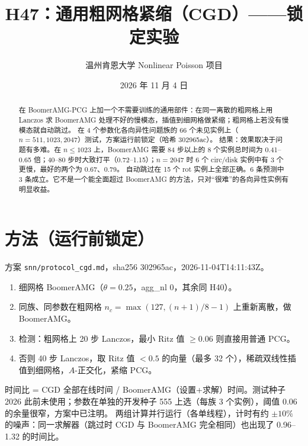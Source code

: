 \documentclass[11pt,a4paper]{ctexart}
\title{H47：通用粗网格紧缩（CGD）——锁定实验}
\author{温州肯恩大学 \quad Nonlinear Poisson 项目}
\date{2026 年 11 月 4 日}
\begin{document}
\sloppy
\maketitle
\begin{abstract}
在 BoomerAMG-PCG 上加一个不需要训练的通用部件：在同一离散的粗网格上用 Lanczos 求 BoomerAMG 处理不好的慢模态，插值到细网格做紧缩；粗网格上若没有慢模态就自动跳过。
在 4 个参数化各向异性问题族的 66 个未见实例上（$n=511,1023,2047$）测试，方案运行前锁定（哈希 302965ac）。
结果：效果取决于问题有多难。在 $n\le1023$ 上，BoomerAMG 需要 84 步以上的 8 个实例总时间为 0.41--0.65 倍；40--80 步时大致打平（0.72--1.15）；$n=2047$ 时 6 个 circ/disk 实例中有 3 个更慢，最好的两个为 0.67、0.79。
自动跳过在 15 个 rot 实例上全部正确。6 条预测中 3 条成立。它不是一个能全面超过 BoomerAMG 的方法，只对“很难”的各向异性实例有明显收益。
\end{abstract}

\section{方法（运行前锁定）}
方案 \texttt{snn/protocol\_cgd.md}，sha256 302965ac，2026-11-04T14:11:43Z。
\begin{enumerate}
\item 细网格 BoomerAMG（$\theta=0.25$，agg\_nl 0，其余同 H40）。
\item 同族、同参数在粗网格 $n_c=\max(127,(n+1)/8-1)$ 上重新离散，做 BoomerAMG。
\item 检测：粗网格上 20 步 Lanczos，最小 Ritz 值 $\ge0.06$ 则直接用普通 PCG。
\item 否则 40 步 Lanczos，取 Ritz 值 $<0.5$ 的向量（最多 32 个），稀疏双线性插值到细网格，$A$-正交化，紧缩 PCG。
\end{enumerate}
时间比 = CGD 全部在线时间 / BoomerAMG（设置+求解）时间。测试种子 2026 此前未使用；参数在单独的开发种子 555 上选（每族 3 个实例），阈值 0.06 的余量很窄，方案中已注明。
两组计算并行运行（各单线程），计时有约 $\pm10\%$ 的噪声：同一求解器（跳过时 CGD 与 BoomerAMG 完全相同）也出现了 0.96--1.32 的时间比。
\end{document}
